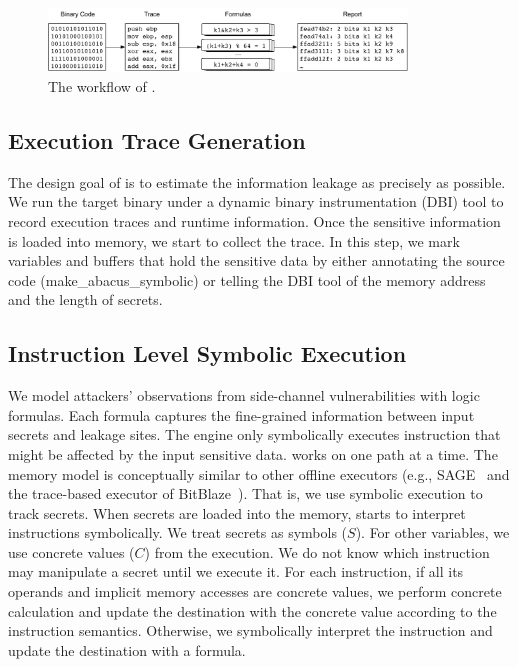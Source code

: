 \begin{figure}[ht]
    \centering
    \includegraphics[width=0.85\textwidth]{./figures/chapter4/workflow.pdf}
    \caption{The workflow of \tool{}.}
    \label{fig:workflow}
\end{figure}

\subsection{Execution Trace Generation} The design goal of \tool{} is to estimate the information leakage as precisely as possible.
We run the target binary under a dynamic binary instrumentation (DBI) tool
to record execution traces and runtime information.
Once the sensitive information is loaded into memory, we start to collect the trace.
In this step, we mark variables and buffers that hold the sensitive data by either annotating the source code (\textsf{make\_abacus\_symbolic}) or telling the DBI tool of the memory address and the length of secrets.

\subsection{Instruction Level Symbolic Execution} We model attackers'
observations from side-channel vulnerabilities with logic formulas.
Each formula captures the fine-grained information between input
secrets and leakage sites. The engine only symbolically executes
instruction that might be affected by the input sensitive data. \tool{} works on one path at a time. The memory model is conceptually similar to other offline executors (e.g., SAGE~\cite{godefroid2008automated} and the trace-based executor of BitBlaze~\cite{song2008bitblaze}). That is, we use symbolic execution to track secrets. When secrets are loaded into the memory, \tool{} starts to interpret instructions symbolically. We treat secrets as symbols ($S$). For other variables, we use concrete values ($C$) from the execution. We do not know which instruction may manipulate a secret until we execute it. For each instruction, if all its operands and implicit memory accesses are concrete values, we perform concrete calculation and update the destination with the concrete value according to the instruction semantics. Otherwise, we symbolically interpret the instruction and update the destination with a formula.

